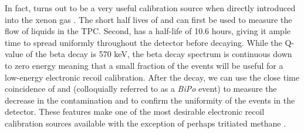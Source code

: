 
In fact,  turns out to be a very useful calibration source when directly introduced into the xenon gas \cite{aprile2017results}.  The short half lives of  and  can first be used to measure the flow of liquids in the TPC.  Second,  has a half-life of 10.6 hours, giving it ample time to spread uniformly throughout the detector before decaying.  While the Q-value of the beta decay is 570 keV, the beta decay spectrum is continuous down to zero energy meaning that a small fraction of the events will be useful for a low-energy electronic recoil calibration.  After the  decay, we can use the close time coincidence of  and  (colloquially referred to as a \textit{BiPo} event) to measure the decrease in the contamination and to confirm the uniformity of the  events in the detector.  These features make  one of the most desirable electronic recoil calibration sources available with the exception of perhaps tritiated methane \cite{akerib2016tritium, aprile2017tritium}.


